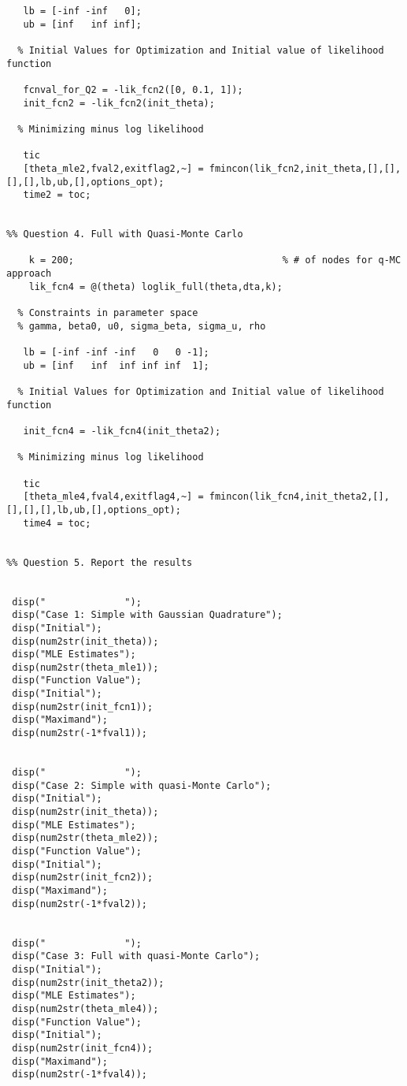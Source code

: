 \documentclass[10pt, letterpaper]{article}
\begin{document}
\begin{verbatim}
   lb = [-inf -inf   0];    
   ub = [inf   inf inf];

  % Initial Values for Optimization and Initial value of likelihood function
  
   fcnval_for_Q2 = -lik_fcn2([0, 0.1, 1]);   
   init_fcn2 = -lik_fcn2(init_theta);
   
  % Minimizing minus log likelihood

   tic
   [theta_mle2,fval2,exitflag2,~] = fmincon(lik_fcn2,init_theta,[],[],[],[],lb,ub,[],options_opt);
   time2 = toc;


%% Question 4. Full with Quasi-Monte Carlo

    k = 200;                                     % # of nodes for q-MC approach
    lik_fcn4 = @(theta) loglik_full(theta,dta,k);

  % Constraints in parameter space
  % gamma, beta0, u0, sigma_beta, sigma_u, rho

   lb = [-inf -inf -inf   0   0 -1];    
   ub = [inf   inf  inf inf inf  1];

  % Initial Values for Optimization and Initial value of likelihood function
  
   init_fcn4 = -lik_fcn4(init_theta2);
   
  % Minimizing minus log likelihood

   tic
   [theta_mle4,fval4,exitflag4,~] = fmincon(lik_fcn4,init_theta2,[],[],[],[],lb,ub,[],options_opt);
   time4 = toc;


%% Question 5. Report the results


 disp("              ");
 disp("Case 1: Simple with Gaussian Quadrature");
 disp("Initial");
 disp(num2str(init_theta));
 disp("MLE Estimates");
 disp(num2str(theta_mle1));
 disp("Function Value");
 disp("Initial");
 disp(num2str(init_fcn1));
 disp("Maximand");
 disp(num2str(-1*fval1));


 disp("              ");
 disp("Case 2: Simple with quasi-Monte Carlo");
 disp("Initial");
 disp(num2str(init_theta));
 disp("MLE Estimates");
 disp(num2str(theta_mle2));
 disp("Function Value");
 disp("Initial");
 disp(num2str(init_fcn2));
 disp("Maximand");
 disp(num2str(-1*fval2));

 
 disp("              ");
 disp("Case 3: Full with quasi-Monte Carlo");
 disp("Initial");
 disp(num2str(init_theta2));
 disp("MLE Estimates");
 disp(num2str(theta_mle4));
 disp("Function Value");
 disp("Initial");
 disp(num2str(init_fcn4));
 disp("Maximand");
 disp(num2str(-1*fval4));

\end{verbatim}
                     
\end{document}
